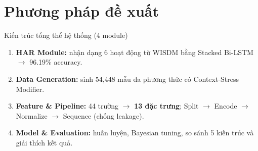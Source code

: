 \documentclass[11pt]{beamer}
\begin{document}
\section{Phương pháp đề xuất}

\begin{frame}{Kiến trúc tổng thể hệ thống (4 module)}
\small
\begin{enumerate}
    \item \textbf{HAR Module:} nhận dạng 6 hoạt động từ WISDM bằng Stacked Bi-LSTM $\rightarrow$ 96.19\% accuracy.
    \item \textbf{Data Generation:} sinh 54,448 mẫu đa phương thức có Context-Stress Modifier.
    \item \textbf{Feature \& Pipeline:} 44 trường $\rightarrow$ \textbf{13 đặc trưng}; Split $\rightarrow$ Encode $\rightarrow$ Normalize $\rightarrow$ Sequence (chống leakage).
    \item \textbf{Model \& Evaluation:} huấn luyện, Bayesian tuning, so sánh 5 kiến trúc và giải thích kết quả.
\end{enumerate}

\vspace{0.15cm}
\end{frame}

\end{document}
